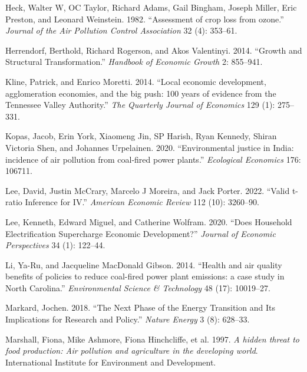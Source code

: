 \documentclass[
]{article}
\newlength{\cslhangindent}
\newlength{\cslentryspacingunit} %
\newenvironment{CSLReferences}[2] %
 {%
  \setlength{\parindent}{0pt}
  \ifodd #1
  \let\oldpar\par
  \def\par{\hangindent=\cslhangindent\oldpar}
  \fi
  \setlength{\parskip}{#2\cslentryspacingunit}
 }%
 {}
\begin{document}
\begin{CSLReferences}{1}{0}
\leavevmode{}%
Heck, Walter W, OC Taylor, Richard Adams, Gail Bingham, Joseph Miller, Eric Preston, and Leonard Weinstein. 1982. {``{Assessment of crop loss from ozone}.''} \emph{{Journal of the Air Pollution Control Association}} 32 (4): 353--61.

\leavevmode{}%
Herrendorf, Berthold, Richard Rogerson, and Akos Valentinyi. 2014. {``Growth and Structural Transformation.''} \emph{{Handbook of Economic Growth}} 2: 855--941.

\leavevmode{}%
Kline, Patrick, and Enrico Moretti. 2014. {``{Local economic development, agglomeration economies, and the big push: 100 years of evidence from the Tennessee Valley Authority}.''} \emph{The Quarterly Journal of Economics} 129 (1): 275--331.

\leavevmode{}%
Kopas, Jacob, Erin York, Xiaomeng Jin, SP Harish, Ryan Kennedy, Shiran Victoria Shen, and Johannes Urpelainen. 2020. {``{Environmental justice in India: incidence of air pollution from coal-fired power plants}.''} \emph{{Ecological Economics}} 176: 106711.

\leavevmode{}%
Lee, David, Justin McCrary, Marcelo J Moreira, and Jack Porter. 2022. {``{Valid t-ratio Inference for IV}.''} \emph{{American Economic Review}} 112 (10): 3260--90.

\leavevmode{}%
Lee, Kenneth, Edward Miguel, and Catherine Wolfram. 2020. {``Does Household Electrification Supercharge Economic Development?''} \emph{{Journal of Economic Perspectives}} 34 (1): 122--44.

\leavevmode{}%
Li, Ya-Ru, and Jacqueline MacDonald Gibson. 2014. {``{Health and air quality benefits of policies to reduce coal-fired power plant emissions: a case study in North Carolina}.''} \emph{{Environmental Science \& Technology}} 48 (17): 10019--27.

\leavevmode{}%
Markard, Jochen. 2018. {``The Next Phase of the Energy Transition and Its Implications for Research and Policy.''} \emph{{Nature Energy}} 3 (8): 628--33.

\leavevmode{}%
Marshall, Fiona, Mike Ashmore, Fiona Hinchcliffe, et al. 1997. \emph{{A hidden threat to food production: Air pollution and agriculture in the developing world}}. {International Institute for Environment and Development.}


\end{CSLReferences}
\end{document}
